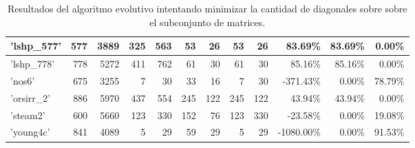 \begin{table}[h]
{\begin{tabular}{|l|r|r|r|r|r|r|r|r|r|r|r|}
\hline
'lshp\_577'                   & 577                                                     & 3889                                                & 325                     & 563                     & 53                      & 26                      & 53                      & 26                      & 83.69\%                             & 83.69\%                            & 0.00\%                         \\ 
\hline
'lshp\_778'                   & 778                                                     & 5272                                                & 411                     & 762                     & 61                      & 30                      & 61                      & 30                      & 85.16\%                             & 85.16\%                            & 0.00\%                         \\ 
\hline
'nos6'                        & 675                                                     & 3255                                                & 7                       & 30                      & 33                      & 16                      & 7                       & 30                      & -371.43\%                           & 0.00\%                             & 78.79\%                        \\ 
\hline
'orsirr\_2'                   & 886                                                     & 5970                                                & 437                     & 554                     & 245                     & 122                     & 245                     & 122                     & 43.94\%                             & 43.94\%                            & 0.00\%                         \\ 
\hline
'steam2'                      & 600                                                     & 5660                                                & 123                     & 330                     & 152                     & 76                      & 123                     & 330                     & -23.58\%                            & 0.00\%                             & 19.08\%                        \\ 
\hline
'young4c'                     & 841                                                     & 4089                                                & 5                       & 29                      & 59                      & 29                      & 5                       & 29                      & -1080.00\%                          & 0.00\%                             & 91.53\%                        \\
\hline
\end{tabular}
}
\caption{Resultados del algoritmo evolutivo intentando minimizar la cantidad de diagonales sobre sobre el subconjunto de matrices.}
\label{tab:diag-reduction-ag-results}
\end{table}



